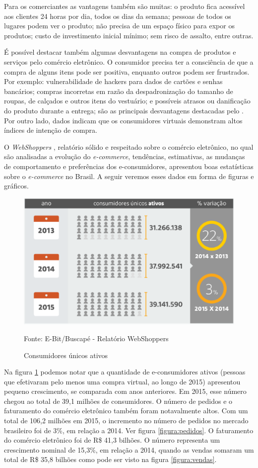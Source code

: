 \documentclass[a4paper,12pt]{monografia}
\begin{document}
Para os comerciantes as vantagens também são muitas: o produto fica acessível aos clientes 24 horas por dia, todos os dias da semana; pessoas de todos os lugares podem ver o produto; não precisa de um espaço físico para expor os produtos; custo de investimento inicial mínimo; sem risco de assalto, entre outras.

É possível destacar também algumas desvantagens na compra de produtos e serviços pelo comércio eletrônico. O consumidor precisa ter a consciência de que a compra de alguns itens pode ser positiva, enquanto outros podem ser frustrados. Por exemplo: vulnerabilidade de hackers para dados de cartões e senhas bancários; compras incorretas em razão da despadronização do tamanho de roupas, de calçados e outros itens do vestuário; e possíveis atrasos ou danificação do produto durante a entrega; são as principais desvantagens destacadas pelo . Por outro lado, dados indicam que os consumidores virtuais demonstram altos índices de intenção de compra.

O \textit{WebShoppers} , relatório sólido e respeitado sobre o comércio eletrônico, no qual são analisadas a evolução do \textit{e-commerce}, tendências, estimativas, as mudanças de comportamento e preferências dos e-consumidores, apresentou boas estatísticas sobre o \textit{e-commerce} no Brasil. A seguir veremos esses dados em forma de figuras e gráficos.

\begin{figure}[H]
\centering
\includegraphics[width=12cm]{img/webshoppers/consumidores.eps}
\caption{Consumidores únicos ativos}
\small{Fonte: E-Bit/Buscapé - Relatório WebShoppers}
\label{figura:consumidores}
\end{figure}

Na figura \ref{figura:consumidores} podemos notar que a quantidade de e-consumidores ativos (pessoas que efetivaram pelo
menos uma compra virtual, ao longo de 2015) apresentou pequeno crescimento, se comparada com anos anteriores. Em 2015, esse número chegou ao total de 39,1 milhões de consumidores. O número de pedidos e o faturamento do comércio eletrônico também foram notavalmente altos. Com um total de 106,2 milhões em 2015, o incremento no número de pedidos no mercado brasileiro foi de 3\%,
em relação a 2014. Ver figura \ref{figura:pedidos}. O faturamento do comércio eletrônico foi de R\$ 41,3 bilhões. O número representa um crescimento nominal de 15,3\%, em relação a 2014, quando as vendas somaram um total de R\$ 35,8 bilhões como pode ser visto na figura \ref{figura:vendas}.
\end{document}
